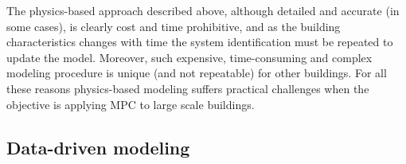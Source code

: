 {The physics-based approach described above, although detailed and accurate (in some cases), is clearly cost and time prohibitive, and as the building characteristics changes with time the system identification must be repeated to update the model. Moreover, such expensive, time-consuming and complex modeling procedure is unique (and not repeatable) for other buildings. For all these reasons physics-based modeling suffers practical challenges when the objective is applying MPC to large scale buildings.
} 






\subsection{Data-driven modeling}

